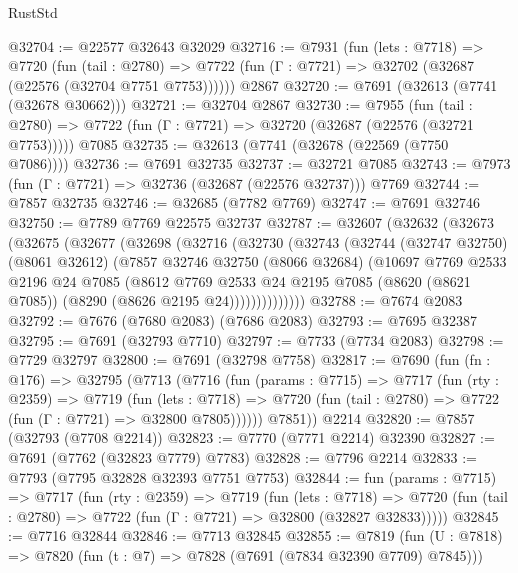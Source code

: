 \begin{lexlean}{RustStd}
\begin{coremodule}
@32704 := @22577 @32643 @32029
@32716 := @7931
    (fun (lets : @7718) =>
    @7720
      (fun (tail : @2780) =>
      @7722 (fun (Γ : @7721) => @32702 (@32687 (@22576 (@32704 @7751 @7753))))))
    @2867
@32720 := @7691 (@32613 (@7741 (@32678 @30662)))
@32721 := @32704 @2867
@32730 := @7955
    (fun (tail : @2780) => @7722 (fun (Γ : @7721) => @32720 (@32687 (@22576 (@32721 @7753)))))
    @7085
@32735 := @32613 (@7741 (@32678 (@22569 (@7750 @7086))))
@32736 := @7691 @32735
@32737 := @32721 @7085
@32743 := @7973 (fun (Γ : @7721) => @32736 (@32687 (@22576 @32737))) @7769
@32744 := @7857 @32735
@32746 := @32685 (@7782 @7769)
@32747 := @7691 @32746
@32750 := @7789 @7769 @22575 @32737
@32787 := @32607
    (@32632
      (@32673
        (@32675
          (@32677
            (@32698
              (@32716
                (@32730
                  (@32743
                    (@32744
                      (@32747 @32750)
                      (@8061 @32612)
                      (@7857
                        @32746
                        @32750
                        (@8066 @32684)
                        (@10697
                          @7769
                          @2533
                          @2196
                          @24
                          @7085
                          (@8612
                            @7769
                            @2533
                            @24
                            @2195
                            @7085
                            (@8620 (@8621 @7085))
                            (@8290 (@8626 @2195 @24))))))))))))))
@32788 := @7674 @2083
@32792 := @7676 (@7680 @2083) (@7686 @2083)
@32793 := @7695 @32387
@32795 := @7691 (@32793 @7710)
@32797 := @7733 (@7734 @2083)
@32798 := @7729 @32797
@32800 := @7691 (@32798 @7758)
@32817 := @7690
    (fun (fn : @176) =>
    @32795
      (@7713
        (@7716
          (fun (params : @7715) =>
          @7717
            (fun (rty : @2359) =>
            @7719
              (fun (lets : @7718) =>
              @7720 (fun (tail : @2780) => @7722 (fun (Γ : @7721) => @32800 @7805))))))
        @7851))
    @2214
@32820 := @7857 (@32793 (@7708 @2214))
@32823 := @7770 (@7771 @2214) @32390
@32827 := @7691 (@7762 (@32823 @7779) @7783)
@32828 := @7796 @2214
@32833 := @7793 (@7795 @32828 @32393 @7751 @7753)
@32844 := fun (params : @7715) =>
  @7717
    (fun (rty : @2359) =>
    @7719
      (fun (lets : @7718) =>
      @7720 (fun (tail : @2780) => @7722 (fun (Γ : @7721) => @32800 (@32827 @32833)))))
@32845 := @7716 @32844
@32846 := @7713 @32845
@32855 := @7819
    (fun (U : @7818) => @7820 (fun (t : @7) => @7828 (@7691 (@7834 @32390 @7709) @7845)))

\end{coremodule}
\end{lexlean}
